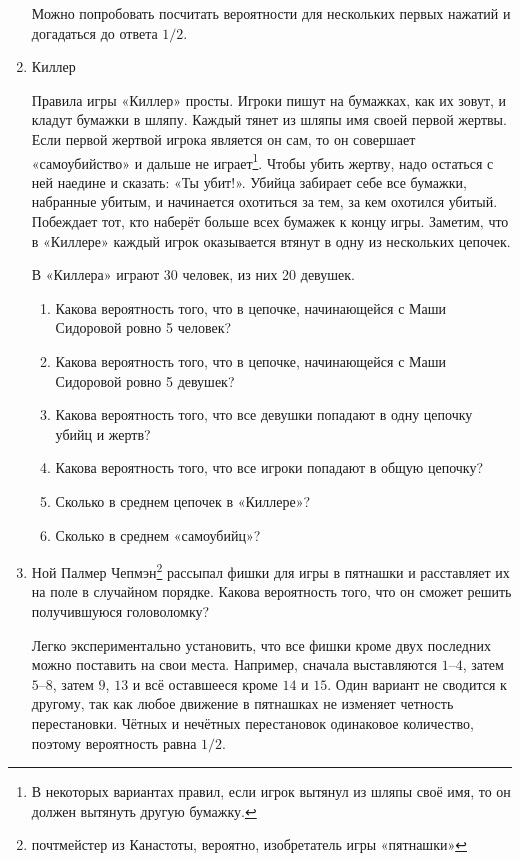 \documentclass[nobib]{tufte-handout}
\begin{document}
\begin{enumerate}
\begin{solution}
Можно попробовать посчитать вероятности для нескольких первых нажатий и догадаться до ответа $1/2$.
\end{solution}

\item Киллер

Правила игры «Киллер» просты. Игроки пишут на бумажках, как их зовут, и кладут бумажки в шляпу. Каждый тянет из шляпы имя своей первой жертвы. Если первой жертвой игрока является он сам, то он совершает «самоубийство» и дальше не играет\footnote{В некоторых вариантах правил, если игрок вытянул из шляпы своё имя, то он должен вытянуть другую бумажку.}. Чтобы убить жертву, надо остаться с ней наедине и сказать: «Ты убит!». Убийца забирает себе все бумажки, набранные убитым, и начинается охотиться за тем, за кем охотился убитый.  Побеждает тот, кто наберёт больше всех бумажек к концу игры. Заметим, что в «Киллере» каждый игрок оказывается втянут в одну из нескольких цепочек.

В «Киллера» играют 30 человек, из них 20 девушек. 

\begin{enumerate}
\item Какова вероятность того, что в цепочке, начинающейся с Маши Сидоровой ровно 5 человек?
\item Какова вероятность того, что в цепочке, начинающейся с Маши Сидоровой ровно 5 девушек?
\item Какова вероятность того, что все девушки попадают в одну цепочку убийц и жертв?
\item Какова вероятность того, что все игроки попадают в общую цепочку?
\item Сколько в среднем цепочек в «Киллере»?
\item Сколько в среднем «самоубийц»?
\end{enumerate}

\begin{solution}

\end{solution}

\item  Ной Палмер Чепмэн\footnote{почтмейстер из Канастоты, вероятно, изобретатель игры «пятнашки»} рассыпал фишки для игры в пятнашки и расставляет их на поле в случайном порядке. Какова вероятность того, что он сможет решить получившуюся головоломку?

\begin{solution}
Легко экспериментально установить, что все фишки кроме двух последних можно поставить на свои места. Например, сначала выставляются $1$--$4$, затем $5$--$8$, затем $9$, $13$ и всё оставшееся кроме $14$ и $15$.  Один вариант не сводится к другому, так как любое движение в пятнашках не изменяет четность перестановки. Чётных и нечётных перестановок одинаковое количество, поэтому вероятность равна $1/2$.
\end{solution}


\end{enumerate}
\end{document}
